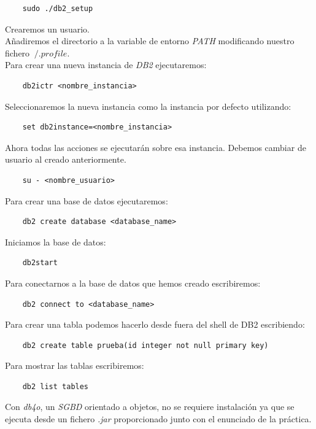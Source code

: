 \documentclass{article}
\begin{document}
\begin{lstlisting}
    sudo ./db2_setup
\end{lstlisting}

Crearemos un usuario.\\
Añadiremos el directorio a la variable de entorno \emph{PATH} modificando nuestro fichero $~/.profile$.\\
Para crear una nueva instancia de \emph{DB2} ejecutaremos:

\begin{lstlisting}
    db2ictr <nombre_instancia>
\end{lstlisting}

Seleccionaremos la nueva instancia como la instancia por defecto utilizando:

\begin{lstlisting}
    set db2instance=<nombre_instancia>
\end{lstlisting}

Ahora todas las acciones se ejecutarán sobre esa instancia.
Debemos cambiar de usuario al creado anteriormente.
\begin{lstlisting}
    su - <nombre_usuario>
\end{lstlisting}

Para crear una base de datos ejecutaremos:
\begin{lstlisting}
    db2 create database <database_name>
\end{lstlisting}

Iniciamos la base de datos:
\begin{lstlisting}
    db2start
\end{lstlisting}

Para conectarnos a la base de datos que hemos creado escribiremos:
\begin{lstlisting}
    db2 connect to <database_name>
\end{lstlisting}

Para crear una tabla podemos hacerlo desde fuera del shell de DB2 escribiendo:
\begin{lstlisting}
    db2 create table prueba(id integer not null primary key)
\end{lstlisting}

Para mostrar las tablas escribiremos:
\begin{lstlisting}
    db2 list tables
\end{lstlisting}

Con \emph{db4o}, un \emph{SGBD} orientado a objetos, no se requiere instalación ya que se ejecuta desde un fichero \emph{.jar} proporcionado junto con el enunciado de la práctica.
\end{document}

